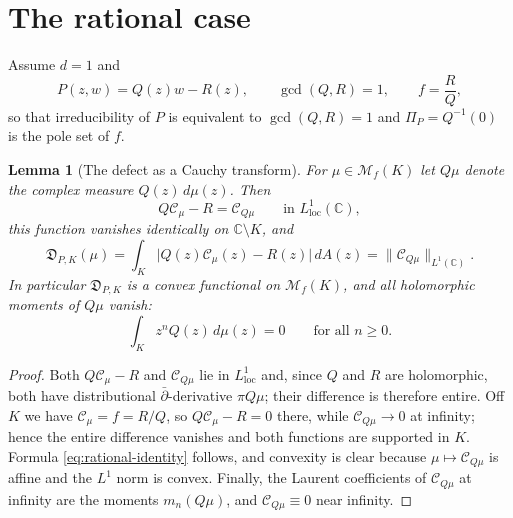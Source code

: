 \documentclass[reqno]{amsart}
\newtheorem{lemma}[theorem]{Lemma}
\theoremstyle{definition}
\theoremstyle{remark}
\newcommand{\bC}{\mathbb C}
\newcommand{\M}{\mathcal M}
\newcommand{\Cauchy}{\mathcal C}
\begin{document}
\section{The rational case}\label{sec:rational}

Assume $d=1$ and
\[
 P(z,w)=Q(z)w-R(z),\qquad \gcd(Q,R)=1,\qquad f=\frac RQ ,
\]
so that irreducibility of $P$ is equivalent to $\gcd(Q,R)=1$ and $\Pi_P=Q^{-1}(0)$
is the pole set of $f$.

\begin{lemma}[The defect as a Cauchy transform]\label{lem:rational-identity}
For $\mu\in\M_f(K)$ let $Q\mu$ denote the complex measure $Q(z)\,d\mu(z)$.  Then
\[
 Q\Cauchy_\mu-R=\Cauchy_{Q\mu}
 \qquad\text{in }L^1_{\mathrm{loc}}(\bC),
\]
this function vanishes identically on $\bC\setminus K$, and
\begin{equation}\label{eq:rational-identity}
 \mathfrak D_{P,K}(\mu)
 =\int_K\bigl|Q(z)\Cauchy_\mu(z)-R(z)\bigr|\,dA(z)
 =\bigl\|\Cauchy_{Q\mu}\bigr\|_{L^1(\bC)} .
\end{equation}
In particular $\mathfrak D_{P,K}$ is a convex functional on $\M_f(K)$, and all
holomorphic moments of $Q\mu$ vanish:
\begin{equation}\label{eq:vanishing-moments}
 \int_Kz^{n}Q(z)\,d\mu(z)=0\qquad\text{for all }n\geq0 .
\end{equation}
\end{lemma}

\begin{proof}
Both $Q\Cauchy_\mu-R$ and $\Cauchy_{Q\mu}$ lie in $L^1_{\mathrm{loc}}$ and, since
$Q$ and $R$ are holomorphic, both have distributional $\bar\partial$-derivative
$\pi Q\mu$; their difference is therefore entire.  Off $K$ we have
$\Cauchy_\mu=f=R/Q$, so $Q\Cauchy_\mu-R=0$ there, while $\Cauchy_{Q\mu}\to0$ at
infinity; hence the entire difference vanishes and both functions are supported
in $K$.  Formula \eqref{eq:rational-identity} follows, and convexity is clear
because $\mu\mapsto\Cauchy_{Q\mu}$ is affine and the $L^1$ norm is convex.
Finally, the Laurent coefficients of $\Cauchy_{Q\mu}$ at infinity are the
moments $m_n(Q\mu)$, and $\Cauchy_{Q\mu}\equiv0$ near infinity.
\end{proof}
\end{document}
